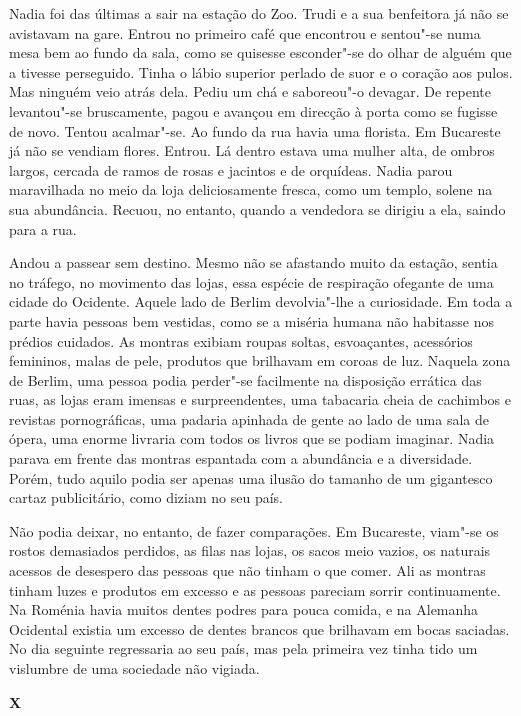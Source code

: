 Nadia foi das últimas a sair na estação do Zoo. Trudi
e a sua benfeitora já não se avistavam na gare. Entrou no primeiro café
que encontrou e sentou"-se numa mesa bem ao fundo da sala, como se
quisesse esconder"-se do olhar de alguém que a tivesse perseguido. Tinha
o lábio superior perlado de suor e o coração aos pulos. Mas ninguém veio
atrás dela. Pediu um chá e saboreou"-o devagar. De repente levantou"-se
bruscamente, pagou e avançou em direcção à porta como se fugisse de
novo. Tentou acalmar"-se. Ao fundo da rua havia uma florista. Em
Bucareste já não se vendiam flores. Entrou. Lá dentro estava uma mulher
alta, de ombros largos, cercada de ramos de rosas e jacintos e de
orquídeas. Nadia parou maravilhada no meio da loja deliciosamente
fresca, como um templo, solene na sua abundância. Recuou, no entanto,
quando a vendedora se dirigiu a ela, saindo para a rua.


Andou a passear sem destino. Mesmo não se afastando muito da estação,
sentia no tráfego, no movimento das lojas, essa espécie de respiração
ofegante de uma cidade do Ocidente. Aquele lado de Berlim devolvia"-lhe a
curiosidade. Em toda a parte havia pessoas bem vestidas, como se a
miséria humana não habitasse nos prédios cuidados. As montras exibiam
roupas soltas, esvoaçantes, acessórios femininos, malas de pele,
produtos que brilhavam em coroas de luz. Naquela zona de Berlim, uma
pessoa podia perder"-se facilmente na disposição errática das ruas, as
lojas eram imensas e surpreendentes, uma tabacaria cheia de cachimbos e
revistas pornográficas, uma padaria apinhada de gente ao lado de uma
sala de ópera, uma enorme livraria com todos os livros que se podiam
imaginar. Nadia parava em frente das montras espantada com a
abundância e a diversidade. Porém, tudo aquilo podia ser apenas uma
ilusão do tamanho de um gigantesco cartaz publicitário, como diziam no
seu país.

Não podia deixar, no entanto, de fazer comparações.
Em Bucareste, viam"-se os rostos demasiados perdidos, as filas nas lojas,
os sacos meio vazios, os naturais acessos de desespero das pessoas que
não tinham o que comer. Ali as montras tinham luzes e produtos em
excesso e as pessoas pareciam sorrir continuamente. Na Roménia havia
muitos dentes podres para pouca comida, e na Alemanha Ocidental
existia um excesso de dentes brancos que brilhavam em bocas saciadas.
No dia seguinte regressaria ao seu país, mas pela primeira vez tinha
tido um vislumbre de uma sociedade não vigiada.


\pagebreak
\thispagestyle{empty}
\movetooddpage
\vspace*{1.8cm}
\noindent{}\textbf{X}

